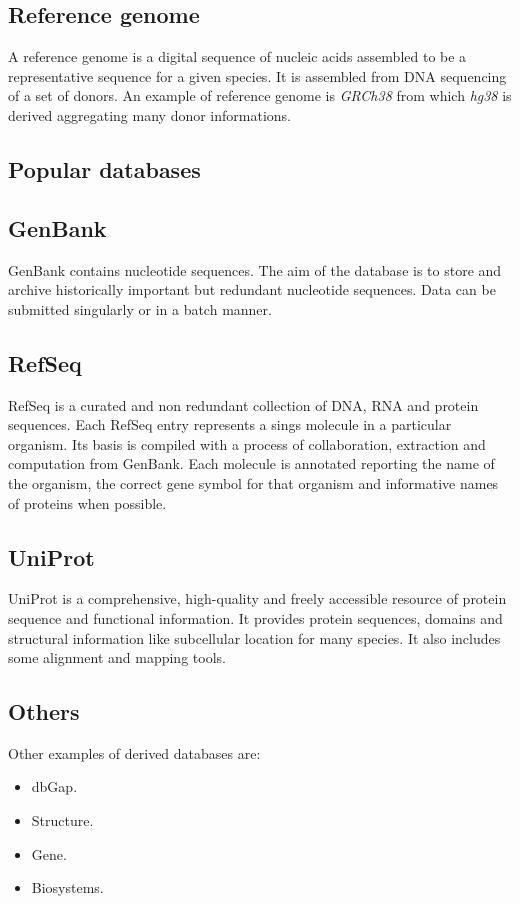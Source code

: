 	\subsection{Reference genome}
	A reference genome is a digital sequence of nucleic acids assembled to be a representative sequence for a given species.
	It is assembled from DNA sequencing of a set of donors.
	An example of reference genome is \emph{GRCh38} from which \emph{hg38} is derived aggregating many donor informations.

\subsection{Popular databases}

	\subsection{GenBank}
	GenBank contains nucleotide sequences.
	The aim of the database is to store and archive historically important but redundant nucleotide sequences.
	Data can be submitted singularly or in a batch manner.

	\subsection{RefSeq}
	RefSeq is a curated and non redundant collection of DNA, RNA and protein sequences.
	Each RefSeq entry represents a sings molecule in a particular organism.
	Its basis is compiled with a process of collaboration, extraction and computation from GenBank.
	Each molecule is annotated reporting the name of the organism, the correct gene symbol for that organism and informative names of proteins when possible.

	\subsection{UniProt}
	UniProt is a comprehensive, high-quality and freely accessible resource of protein sequence and functional information.
	It provides protein sequences, domains and structural information like subcellular location for many species.
	It also includes some alignment and mapping tools.

	\subsection{Others}
	Other examples of derived databases are:

	\begin{multicols}{4}
		\begin{itemize}
			\item dbGap.
			\item Structure.
			\item Gene.
			\item Biosystems.
		\end{itemize}
	\end{multicols}

